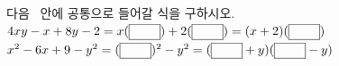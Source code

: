 다음 \blank\ 안에 공통으로 들어갈 식을 구하시오.
 $4xy-x+8y-2=x(\blank[2.5em])+2(\blank[2.5em])=(x+2)(\blank[2.5em])$
 $x^2-6x+9-y^2=(\blank[2.5em])^2-y^2=(\blank[2.5em]+y)(\blank[2.5em]-y)$
